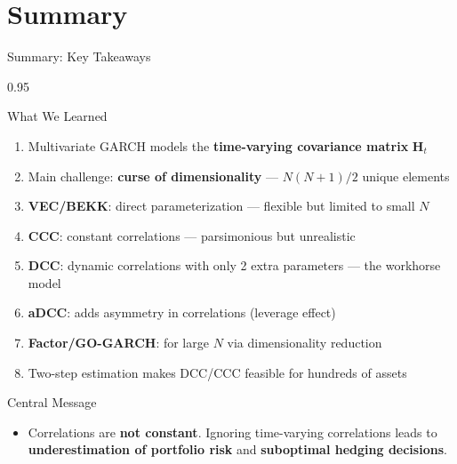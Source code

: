 \documentclass[9pt, aspectratio=169, t]{beamer}
\begin{document}
\section{Summary}

\begin{frame}{Summary: Key Takeaways}
    \begin{cminipage}{0.95\textwidth}
    {\scriptsize
    \begin{block}{What We Learned}
        \begin{enumerate}\setlength{\itemsep}{1pt}
            \item Multivariate GARCH models the \textbf{time-varying covariance matrix} $\mathbf{H}_t$
            \item Main challenge: \textbf{curse of dimensionality} --- $N(N+1)/2$ unique elements
            \item \textbf{VEC/BEKK}: direct parameterization --- flexible but limited to small $N$
            \item \textbf{CCC}: constant correlations --- parsimonious but unrealistic
            \item \textbf{DCC}: dynamic correlations with only 2 extra parameters --- the workhorse model
            \item \textbf{aDCC}: adds asymmetry in correlations (leverage effect)
            \item \textbf{Factor/GO-GARCH}: for large $N$ via dimensionality reduction
            \item Two-step estimation makes DCC/CCC feasible for hundreds of assets
        \end{enumerate}
    \end{block}
    \begin{alertblock}{Central Message}
        \begin{itemize}\setlength{\itemsep}{0pt}
            \item Correlations are \textbf{not constant}. Ignoring time-varying correlations leads to \textbf{underestimation of portfolio risk} and \textbf{suboptimal hedging decisions}.
        \end{itemize}
    \end{alertblock}
    }
    \end{cminipage}
\end{frame}
\end{document}
